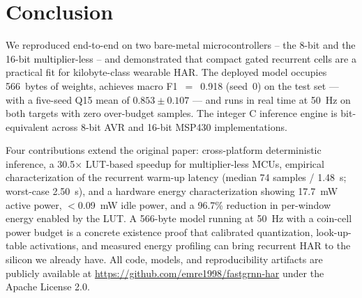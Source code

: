 \section{Conclusion}
\label{sec:conclusion}

We reproduced \fastgrnn{} end-to-end on two bare-metal
microcontrollers -- the 8-bit \arduino{} and the 16-bit
multiplier-less \msp{} -- and demonstrated that compact gated
recurrent cells are a practical fit for kilobyte-class wearable
HAR. The deployed model occupies 566~bytes of weights, achieves
macro F1~$=$~0.918 (seed~0) on the \hapt{} test set --- with a
five-seed Q15 mean of $0.853{\pm}0.107$ --- and runs in real time
at 50~Hz on both targets with zero over-budget samples. The
integer C inference engine is bit-equivalent across 8-bit AVR and
16-bit MSP430 implementations.

Four contributions extend the original \fastgrnn{} paper:
cross-platform deterministic inference, a 30.5$\times$ LUT-based
speedup for multiplier-less MCUs, empirical characterization of the
recurrent warm-up latency (median 74 samples / 1.48~s; worst-case
2.50~s), and a hardware energy characterization showing 17.7~mW
active power, $<$0.09~mW idle power, and a 96.7\% reduction in
per-window energy enabled by the LUT. A 566-byte model running at
50~Hz with a coin-cell power budget is a concrete existence proof
that calibrated quantization, look-up-table activations, and
measured energy profiling can bring recurrent HAR to the silicon we
already have. All code, models, and reproducibility artifacts are
publicly available at \url{https://github.com/emre1998/fastgrnn-har}
under the Apache License 2.0.
